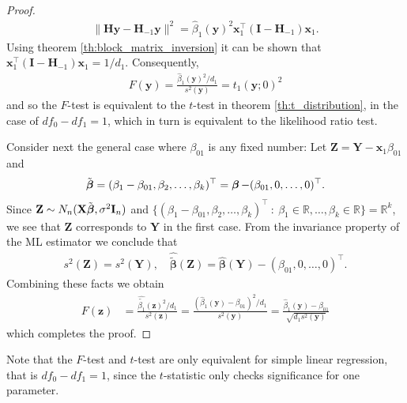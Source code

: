 \begin{proof}
    \begin{align*}
        \|\textbf{H}\textbf{y} - \textbf{H}_{-1}\textbf{y}\|^2 = \hat{\beta}_1(\textbf{y})^2\textbf{x}_1^\top(\textbf{I} - \textbf{H}_{-1})\textbf{x}_1.
    \end{align*}
    Using theorem \ref{th:block_matrix_inversion} it can be shown that $\textbf{x}_1^\top(\textbf{I} - \textbf{H}_{-1})\textbf{x}_1 = 1/d_1$.
    Consequently,
    \begin{align*}
         F(\textbf{y}) = \frac{\hat{\beta}_1(\textbf{y})^2/d_1}{s^2(\textbf{y})} =  t_1(\textbf{y};0)^2
    \end{align*}
    and so the $F$-test is equivalent to the $t$-test in theorem \ref{th:t_distribution}, in the case of $df_0 - df_1=1$, which in turn is equivalent to the likelihood ratio test.
    
    Consider next the general case where $\beta_{01}$ is any fixed number: Let $\textbf{Z} = \textbf{Y} - \textbf{x}_1\beta_{01}$ and
    \begin{align*}
        \Tilde{\operatorname{\boldsymbol{\beta}}} = (\beta_1 - \beta_{01}, \beta_2, \ldots, \beta_k)^\top = \operatorname{\boldsymbol{\beta}} - (\beta_{01}, 0, \ldots, 0)^\top.
    \end{align*}
    Since $\textbf{Z} \sim N_n(\textbf{X}\Tilde{\boldsymbol{\beta}}, \sigma^2\textbf{I}_n)$ and $\{ (\beta_1 - \beta_{01}, \beta_2, \ldots, \beta_k)^\top \: : \: \beta_1 \in \mathbb{R}, \ldots, \beta_k \in \mathbb{R} \} = \mathbb{R}^k$, we see that $\textbf{Z}$ corresponds to $\textbf{Y}$ in the first case.
    From the invariance property of the ML estimator we conclude that
    \begin{align*}
        s^2(\textbf{Z}) = s^2(\textbf{Y}), \quad \hat{\tilde{\boldsymbol{\beta}}}(\textbf{Z}) = \hat{\boldsymbol{\beta}}(\textbf{Y}) - (\beta_{01}, 0, \ldots, 0)^\top.
    \end{align*}
    Combining these facts we obtain
    \begin{align*}
        F(\textbf{z}) &=
        \frac{\hat{\tilde{\beta_1}}(\textbf{z})^2/d_1}{s^2(\textbf{z})} = 
        \frac{(\hat{\beta}_1(\textbf{y}) - \beta_{01})^2/d_1}{s^2(\textbf{y})} =
         \frac{\hat{\beta}_1(\textbf{y}) - \beta_{01}}{\sqrt{d_1s^2(\textbf{y})}}
    \end{align*}
    which completes the proof.
\end{proof}

Note that the $F$-test and $t$-test are only equivalent for simple linear regression, that is $df_0 - df_1 = 1$, since the $t$-statistic only checks significance for one parameter.


